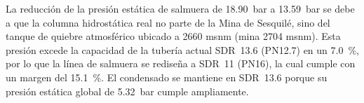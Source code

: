 La reducción de la presión estática de salmuera de \SI{18.90}{bar} a \SI{13.59}{bar} se debe a que la columna hidrostática real no parte de la Mina de Sesquilé, sino del tanque de quiebre atmosférico ubicado a 2660 msnm (mina 2704 msnm). Esta presión excede la capacidad de la tubería actual SDR~13.6 (PN12.7) en un \SI{7.0}{\percent}, por lo que la línea de salmuera se rediseña a SDR~11 (PN16), la cual cumple con un margen del \SI{15.1}{\percent}. El condensado se mantiene en SDR~13.6 porque su presión estática global de \SI{5.32}{bar} cumple ampliamente.

